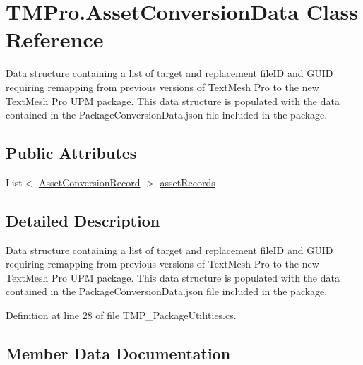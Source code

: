 \hypertarget{class_t_m_pro_1_1_asset_conversion_data}{}\section{T\+M\+Pro.\+Asset\+Conversion\+Data Class Reference}
\label{class_t_m_pro_1_1_asset_conversion_data}


Data structure containing a list of target and replacement file\+ID and G\+U\+ID requiring remapping from previous versions of Text\+Mesh Pro to the new Text\+Mesh Pro U\+PM package. This data structure is populated with the data contained in the Package\+Conversion\+Data.\+json file included in the package.  


\subsection*{Public Attributes}
\begin{DoxyCompactItemize}
\item 
List$<$ \mbox{\hyperlink{struct_t_m_pro_1_1_asset_conversion_record}{Asset\+Conversion\+Record}} $>$ \mbox{\hyperlink{class_t_m_pro_1_1_asset_conversion_data_af8fb67a3f99e7c37cc2f4f187fe47c0a}{asset\+Records}}
\end{DoxyCompactItemize}


\subsection{Detailed Description}
Data structure containing a list of target and replacement file\+ID and G\+U\+ID requiring remapping from previous versions of Text\+Mesh Pro to the new Text\+Mesh Pro U\+PM package. This data structure is populated with the data contained in the Package\+Conversion\+Data.\+json file included in the package. 



Definition at line 28 of file T\+M\+P\+\_\+\+Package\+Utilities.\+cs.



\subsection{Member Data Documentation}
\mbox{\label{class_t_m_pro_1_1_asset_conversion_data_af8fb67a3f99e7c37cc2f4f187fe47c0a}} 
